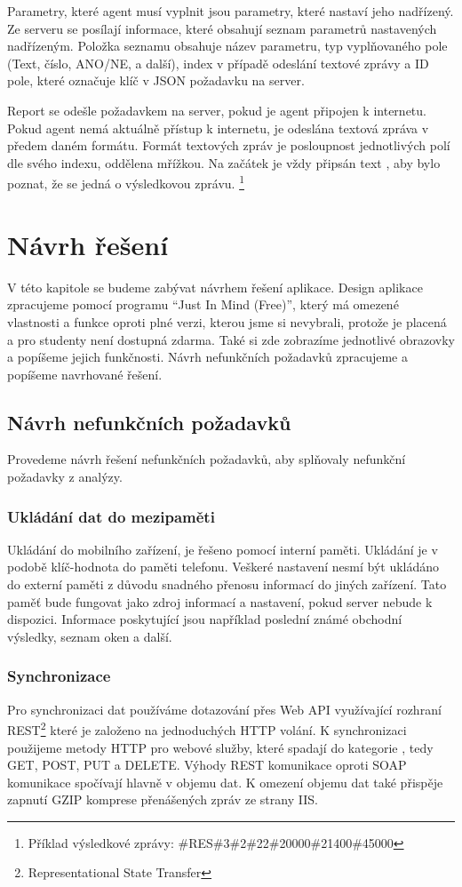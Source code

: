 \documentclass[11pt,twoside,a4paper]{book}
\begin{document}
Parametry, které agent musí vyplnit jsou parametry, které nastaví jeho nadřízený. Ze serveru se posílají informace, které obsahují seznam parametrů nastavených nadřízeným. Položka seznamu obsahuje název parametru, typ vyplňovaného pole (Text, číslo, ANO/NE, a další), index v případě odeslání textové zprávy a ID pole, které označuje klíč v JSON požadavku na server.

Report se odešle požadavkem na server, pokud je agent připojen k internetu. Pokud agent nemá aktuálně přístup k internetu, je odeslána textová zpráva v předem daném formátu. Formát textových zpráv je posloupnost jednotlivých polí dle svého indexu, oddělena mřížkou. Na začátek je vždy připsán text , aby bylo poznat, že se jedná o výsledkovou zprávu. \footnote{Příklad výsledkové zprávy: \#RES\#3\#2\#22\#20000\#21400\#45000}

\chapter{Návrh řešení}
V této kapitole se budeme zabývat návrhem řešení aplikace. Design aplikace zpracujeme pomocí programu “Just In Mind (Free)”, který má omezené vlastnosti a funkce oproti plné verzi, kterou jsme si nevybrali, protože je placená a pro studenty není dostupná zdarma. Také si zde zobrazíme jednotlivé obrazovky a popíšeme jejich funkčnosti. Návrh nefunkčních požadavků zpracujeme a popíšeme navrhované řešení.

\section{Návrh nefunkčních požadavků}
Provedeme návrh řešení nefunkčních požadavků, aby splňovaly nefunkční požadavky z analýzy.

\subsection{Ukládání dat do mezipaměti}
Ukládání do mobilního zařízení, je řešeno pomocí interní paměti. Ukládání je v podobě klíč-hodnota do paměti telefonu. Veškeré nastavení nesmí být ukládáno do externí paměti z důvodu snadného přenosu informací do jiných zařízení. Tato paměť bude fungovat jako zdroj informací a nastavení, pokud server nebude k dispozici. Informace poskytující jsou například poslední známé obchodní výsledky, seznam oken a další.

\subsection{Synchronizace}
Pro synchronizaci dat používáme dotazování přes Web API využívající rozhraní REST\footnote{Representational State Transfer} které je založeno na jednoduchých HTTP volání. K synchronizaci použijeme metody HTTP pro webové služby, které spadají do kategorie , tedy GET, POST, PUT a DELETE. Výhody REST komunikace oproti SOAP komunikace spočívají hlavně v objemu dat. K omezení objemu dat také přispěje zapnutí GZIP komprese přenášených zpráv ze strany IIS. \cite{rest}
\end{document}
